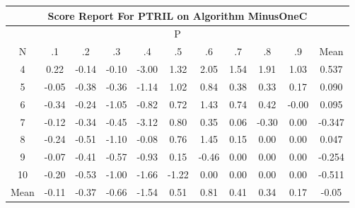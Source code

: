 \documentclass[11pt,a4paper]{report}
\begin{document}
\begin{longtable}{ | c || c | c | c | c | c | c | c | c | c || c |}
\hline
\multicolumn{11}{|c|}{ Score Report For PTRIL on Algorithm MinusOneC} \\
\hline
\multicolumn{11}{|c|}{ P } \\
\hline
N & .1 & .2 & .3 & .4 & .5 & .6 & .7 & .8 & .9 & Mean\\
 \hline
 \hline
 \endhead
  4 &  \cellcolor[HTML]{F7F7FF} 0.22 &  \cellcolor[HTML]{FFFFFF} -0.14 &  \cellcolor[HTML]{FFFFFF} -0.10 &  \cellcolor[HTML]{FFB7B7} -3.00 &  \cellcolor[HTML]{DFDFFF} 1.32 &  \cellcolor[HTML]{CFCFFF} 2.05 &  \cellcolor[HTML]{D7D7FF} 1.54 &  \cellcolor[HTML]{CFCFFF} 1.91 &  \cellcolor[HTML]{E7E7FF} 1.03 & 0.537 \\
  5 &  \cellcolor[HTML]{FFFFFF} -0.05 &  \cellcolor[HTML]{FFF7F7} -0.38 &  \cellcolor[HTML]{FFF7F7} -0.36 &  \cellcolor[HTML]{FFDFDF} -1.14 &  \cellcolor[HTML]{E7E7FF} 1.02 &  \cellcolor[HTML]{E7E7FF} 0.84 &  \cellcolor[HTML]{F7F7FF} 0.38 &  \cellcolor[HTML]{F7F7FF} 0.33 &  \cellcolor[HTML]{F7F7FF} 0.17 & 0.090 \\
  6 &  \cellcolor[HTML]{FFF7F7} -0.34 &  \cellcolor[HTML]{FFF7F7} -0.24 &  \cellcolor[HTML]{FFE7E7} -1.05 &  \cellcolor[HTML]{FFE7E7} -0.82 &  \cellcolor[HTML]{EFEFFF} 0.72 &  \cellcolor[HTML]{DFDFFF} 1.43 &  \cellcolor[HTML]{EFEFFF} 0.74 &  \cellcolor[HTML]{F7F7FF} 0.42 &  \cellcolor[HTML]{FFFFFF} -0.00 & 0.095 \\
  7 &  \cellcolor[HTML]{FFFFFF} -0.12 &  \cellcolor[HTML]{FFF7F7} -0.34 &  \cellcolor[HTML]{FFF7F7} -0.45 &  \cellcolor[HTML]{FFAFAF} -3.12 &  \cellcolor[HTML]{E7E7FF} 0.80 &  \cellcolor[HTML]{F7F7FF} 0.35 &  \cellcolor[HTML]{FFFFFF} 0.06 &  \cellcolor[HTML]{FFF7F7} -0.30 &  \cellcolor[HTML]{FFFFFF} 0.00 & -0.347 \\
  8 &  \cellcolor[HTML]{FFF7F7} -0.24 &  \cellcolor[HTML]{FFEFEF} -0.51 &  \cellcolor[HTML]{FFE7E7} -1.10 &  \cellcolor[HTML]{FFFFFF} -0.08 &  \cellcolor[HTML]{EFEFFF} 0.76 &  \cellcolor[HTML]{D7D7FF} 1.45 &  \cellcolor[HTML]{FFFFFF} 0.15 &  \cellcolor[HTML]{FFFFFF} 0.00 &  \cellcolor[HTML]{FFFFFF} 0.00 & 0.047 \\
  9 &  \cellcolor[HTML]{FFFFFF} -0.07 &  \cellcolor[HTML]{FFF7F7} -0.41 &  \cellcolor[HTML]{FFEFEF} -0.57 &  \cellcolor[HTML]{FFE7E7} -0.93 &  \cellcolor[HTML]{FFFFFF} 0.15 &  \cellcolor[HTML]{FFF7F7} -0.46 &  \cellcolor[HTML]{FFFFFF} 0.00 &  \cellcolor[HTML]{FFFFFF} 0.00 &  \cellcolor[HTML]{FFFFFF} 0.00 & -0.254 \\
  10 &  \cellcolor[HTML]{FFF7F7} -0.20 &  \cellcolor[HTML]{FFEFEF} -0.53 &  \cellcolor[HTML]{FFE7E7} -1.00 &  \cellcolor[HTML]{FFD7D7} -1.66 &  \cellcolor[HTML]{FFDFDF} -1.22 &  \cellcolor[HTML]{FFFFFF} 0.00 &  \cellcolor[HTML]{FFFFFF} 0.00 &  \cellcolor[HTML]{FFFFFF} 0.00 &  \cellcolor[HTML]{FFFFFF} 0.00 & -0.511 \\
 \hline
 \hline
Mean &  \cellcolor[HTML]{FFFFFF} -0.11 &  \cellcolor[HTML]{FFF7F7} -0.37 &  \cellcolor[HTML]{FFEFEF} -0.66 &  \cellcolor[HTML]{FFD7D7} -1.54 &  \cellcolor[HTML]{EFEFFF} 0.51 &  \cellcolor[HTML]{E7E7FF} 0.81 &  \cellcolor[HTML]{F7F7FF} 0.41 &  \cellcolor[HTML]{F7F7FF} 0.34 &  \cellcolor[HTML]{F7F7FF} 0.17 &  \cellcolor[HTML]{FFFFFF} -0.05
\end{longtable}
\end{document}

